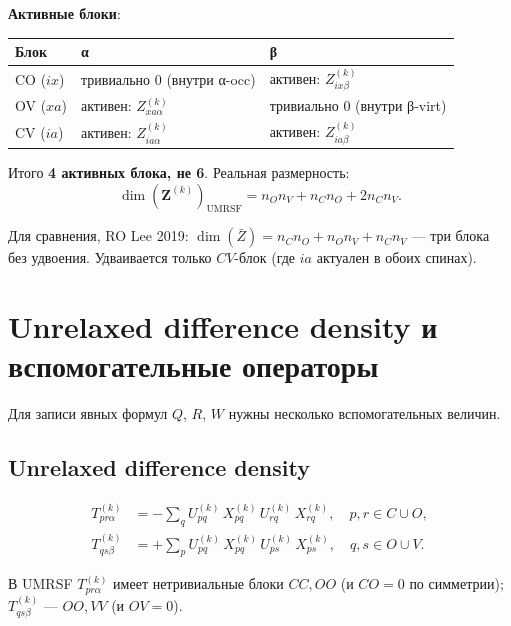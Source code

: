 \documentclass[11pt, a4paper]{article}
\theoremstyle{definition}
\newcommand{\bZ}{\bar Z}
\newcommand{\Uk}[2]{U^{(#1)}_{#2}}
\newcommand{\Xk}[2]{X^{(#1)}_{#2}}
\newcommand{\Zk}[2]{Z^{(#1)}_{#2}}
\newcommand{\Tk}[2]{T^{(#1)}_{#2}}
\begin{document}
\textbf{Активные блоки}:

\begin{center}
\begin{tabular}{lll}
\toprule
Блок & α & β \\
\midrule
CO ($ix$) & тривиально 0 (внутри α-occ) & активен: $\Zk{k}{ix\beta}$ \\
OV ($xa$) & активен: $\Zk{k}{xa\alpha}$ & тривиально 0 (внутри β-virt) \\
CV ($ia$) & активен: $\Zk{k}{ia\alpha}$ & активен: $\Zk{k}{ia\beta}$ \\
\bottomrule
\end{tabular}
\end{center}

Итого \textbf{4 активных блока, не 6}. Реальная размерность:
\begin{equation}
    \boxed{\;
    \dim(\mathbf Z^{(k)})_{\text{UMRSF}} = n_O n_V + n_C n_O + 2 n_C n_V.
    \;}
    \label{eq:Zdim}
\end{equation}

Для сравнения, RO Lee 2019: $\dim(\bZ) = n_C n_O + n_O n_V + n_C n_V$ --- три блока без удвоения. Удваивается только $CV$-блок (где $ia$ актуален в обоих спинах).

\section{Unrelaxed difference density и вспомогательные операторы}
\label{sec:aux}

Для записи явных формул $Q$, $R$, $W$ нужны несколько вспомогательных величин.

\subsection{Unrelaxed difference density}

\begin{align}
    \Tk{k}{pr\alpha} &= -\sum_q \Uk{k}{pq}\, \Xk{k}{pq}\, \Uk{k}{rq}\, \Xk{k}{rq}, \quad p, r \in C \cup O, \label{eq:Talpha} \\
    \Tk{k}{qs\beta} &= +\sum_p \Uk{k}{pq}\, \Xk{k}{pq}\, \Uk{k}{ps}\, \Xk{k}{ps}, \quad q, s \in O \cup V. \label{eq:Tbeta}
\end{align}

В UMRSF $\Tk{k}{pr\alpha}$ имеет нетривиальные блоки $CC, OO$ (и $CO = 0$ по симметрии); $\Tk{k}{qs\beta}$ --- $OO, VV$ (и $OV = 0$).
\end{document}
